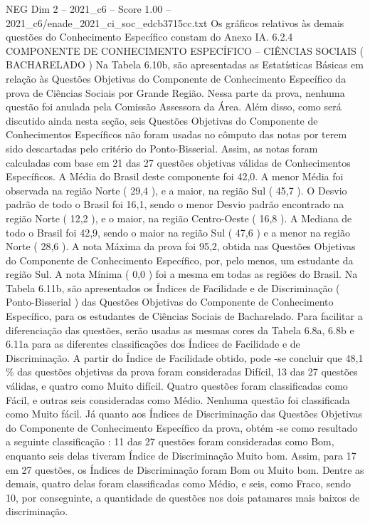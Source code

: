\begin{textsample}{NEG Dim 2 – 2021\_c6 – Score 1.00 – 2021\_c6/enade\_2021\_ci\_soc\_edcb3715cc.txt}
Os gráficos relativos às demais questões do Conhecimento Específico constam do Anexo IA. 6.2.4 COMPONENTE DE CONHECIMENTO ESPECÍFICO – CIÊNCIAS SOCIAIS ( BACHARELADO ) Na Tabela 6.10b, são apresentadas as Estatísticas Básicas em relação às Questões Objetivas do Componente de Conhecimento Específico da prova de Ciências Sociais por Grande Região.
Nessa parte da prova, nenhuma questão foi anulada pela Comissão Assessora da Área.
Além disso, como será discutido ainda nesta seção, seis Questões Objetivas do Componente de Conhecimentos Específicos não foram usadas no cômputo das notas por terem sido descartadas pelo critério do Ponto-Bisserial.
Assim, as notas foram calculadas com base em 21 das 27 questões objetivas válidas de Conhecimentos Específicos.
A Média do Brasil deste componente foi 42,0.
A menor Média foi observada na região Norte ( 29,4 ), e a maior, na região Sul ( 45,7 ).
O Desvio padrão de todo o Brasil foi 16,1, sendo o menor Desvio padrão encontrado na região Norte ( 12,2 ), e o maior, na região Centro-Oeste ( 16,8 ).
A Mediana de todo o Brasil foi 42,9, sendo o maior na região Sul ( 47,6 ) e a menor na região Norte ( 28,6 ).
A nota Máxima da prova foi 95,2, obtida nas Questões Objetivas do Componente de Conhecimento Específico, por, pelo menos, um estudante da região Sul.
A nota Mínima ( 0,0 ) foi a mesma em todas as regiões do Brasil.
Na Tabela 6.11b, são apresentados os Índices de Facilidade e de Discriminação ( Ponto-Bisserial ) das Questões Objetivas do Componente de Conhecimento Específico, para os estudantes de Ciências Sociais de Bacharelado.
Para facilitar a diferenciação das questões, serão usadas as mesmas cores da Tabela 6.8a, 6.8b e 6.11a para as diferentes classificações dos Índices de Facilidade e de Discriminação.
A partir do Índice de Facilidade obtido, pode -se concluir que 48,1 \% das questões objetivas da prova foram consideradas Difícil, 13 das 27 questões válidas, e quatro como Muito difícil.
Quatro questões foram classificadas como Fácil, e outras seis consideradas como Médio.
Nenhuma questão foi classificada como Muito fácil.
Já quanto aos Índices de Discriminação das Questões Objetivas do Componente de Conhecimento Específico da prova, obtém -se como resultado a seguinte classificação : 11 das 27 questões foram consideradas como Bom, enquanto seis delas tiveram Índice de Discriminação Muito bom.
Assim, para 17 em 27 questões, os Índices de Discriminação foram Bom ou Muito bom.
Dentre as demais, quatro delas foram classificadas como Médio, e seis, como Fraco, sendo 10, por conseguinte, a quantidade de questões nos dois patamares mais baixos de discriminação.

\end{textsample}
